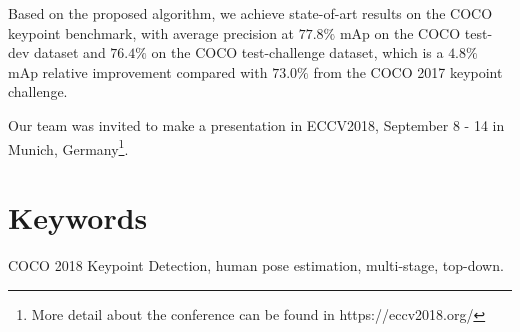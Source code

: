 \documentclass[oneside]{memoir}
\begin{document}
Based on the proposed algorithm, we achieve state-of-art results on the COCO keypoint benchmark, with average
precision at $77.8\%$ mAp on the COCO test-dev dataset and $76.4\%$ on the COCO test-challenge dataset, which is a $4.8\%$ mAp
relative improvement compared with $73.0\%$ from the COCO 2017 keypoint challenge.

Our team was invited to make a presentation in ECCV2018, September 8 - 14 in Munich, Germany\footnote{More detail about the conference can be found in https://eccv2018.org/}.
\section*{Keywords}
COCO 2018 Keypoint Detection, human pose estimation, multi-stage, top-down.


\setcounter{page}{1}
















\appendix

% 
\end{document}

